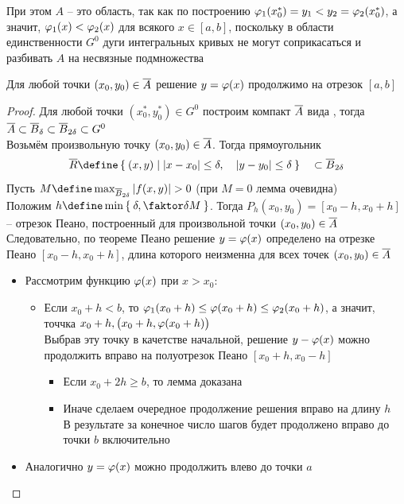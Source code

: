 При этом $ A $  -- это область, так как по построению $ \varphi_1(x_0^*) = y_1 < y_2 = \varphi_2(x_0^*) $, а значит, $ \varphi_1(x) < \varphi_2(x) $ для всякого $ x \in [a, b] $, поскольку в области единственности $ G^0 $ дуги интегральных кривых не могут соприкасаться и разбивать $ A $ на несвязные подмножества

\begin{lemma}\label{lm:comp}
    Для любой точки $ (x_0, y_0) \in \overline{A} $ решение  $ y = \varphi(x) $ продолжимо на отрезок $ [a, b] $
\end{lemma}

\begin{proof}
    Для любой точки $ (x_0^*, y_0^*) \in G^0 $ построим компакт $ \overline{A} $ вида , тогда $ \overline{A} \subset \overline{B}_\delta \subset \overline{B}_{2\delta} \subset G^0 $ \\
    Возьмём произвольную точку $ (x_0, y_0) \in \overline{A} $. Тогда прямоугольник
    $$ \ol{R} \define \set{(x, y) | {} |x - x_0| \le \delta, \quad | y - y_0| \le \delta} \quad \sub \ol{B}_{2\delta} $$
    Пусть $ M \define \max_{\ol{B}_{2\delta}}|f(x, y)| > 0 $ (при $ M = 0 $ лемма очевидна) \\
    Положим $ h \define \min\set{\delta, \faktor\delta{M}} $. Тогда $ P_h(x_0, y_0) = [x_0 - h, x_0 + h] $ -- отрезок Пеано, построенный для произвольной точки $ (x_0, y_0) \in \overline{A} $ \\
    Следовательно, по теореме Пеано решение  $ y = \varphi(x) $ определено на отрезке Пеано $ [x_0 - h, x_0 + h] $, длина которого неизменна для всех точек $ (x_0, y_0) \in \overline{A} $
    \begin{itemize}
    	\item Рассмотрим функцию $ \varphi(x) $ при $ x > x_0 $:
        \begin{itemize}
        	\item Если $ x_0 + h < b $, то $ \varphi_1(x_0 + h) \le \varphi(x_0 + h) \le \varphi_2(x_0 + h) $, а значит, точчка $ x_0 + h, \big( x_0 + h, \varphi(x_0 + h) \big) $ \\
            Выбрав эту точку в качетстве начальной, решение $ y - \varphi(x) $ можно продолжить вправо на полуотрезок Пеано $ [x_0 + h, x_0 - h] $
            \begin{itemize}
            	\item Если $ x_0 + 2h \ge b $, то лемма доказана
                \item Иначе сделаем очередное продолжение решения вправо на длину $ h $ \\
                В результате за конечное число шагов будет продолжено вправо до точки $ b $ включительно
            \end{itemize}
        \end{itemize}
        \item Аналогично $ y = \varphi(x) $ можно продолжить влево до точки $ a $
    \end{itemize}
\end{proof}


